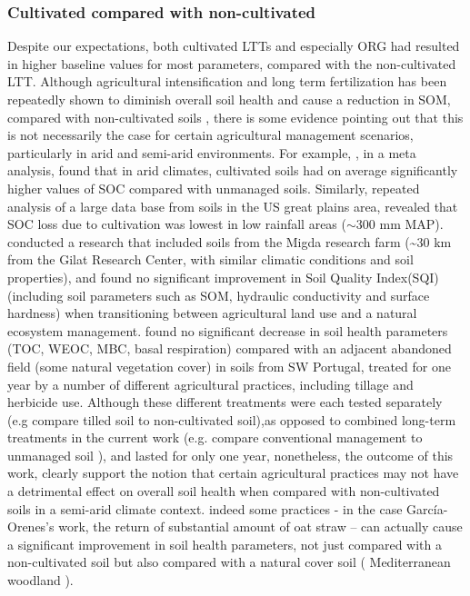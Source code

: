 \documentclass[12pt]{report}
\begin{document}
		\subsubsection{Cultivated compared with non-cultivated}
			Despite our expectations, both cultivated LTTs and especially ORG had resulted in higher baseline values for most parameters, compared with the non-cultivated LTT. Although agricultural intensification and long term fertilization has been repeatedly shown to diminish overall soil health and cause a reduction in SOM, compared with non-cultivated soils \citep{laurance2014, mganga2016, tilman2011}, there is some evidence pointing out that this is not necessarily the case for certain agricultural management scenarios, particularly in arid and semi-arid environments.  For example, \citet{trivedi2016}, in a meta analysis, found that in arid climates, cultivated soils had on average significantly higher values of SOC compared with unmanaged soils. Similarly, repeated analysis of a large data base from soils in the US great plains area, revealed that SOC loss due to cultivation was lowest in low rainfall areas ($ \sim $300 mm MAP)\citep{miller2004, burke1989}. \citet{paz-kagan2014} conducted a research that included soils from the Migda research farm (\~{}30 km from the Gilat Research Center, with similar climatic conditions and soil properties), and found no significant improvement in Soil Quality Index(SQI) (including soil parameters such as SOM, hydraulic conductivity and surface hardness) when transitioning between agricultural land use and a natural ecosystem management. \citet{garcia-orenes2010} found no significant decrease in soil health parameters (TOC, WEOC, MBC, basal respiration) compared with an adjacent abandoned field (some natural vegetation cover) in soils from SW Portugal, treated for one year by  a number of different agricultural practices, including tillage and herbicide use. Although these different treatments were each tested separately (e.g compare tilled soil to non-cultivated soil),as opposed to combined long-term treatments in the current work (e.g. compare conventional management to unmanaged soil ), and lasted for only one year, nonetheless, the outcome of this work, clearly support the notion that certain agricultural practices may not have a detrimental effect on overall soil health when compared with non-cultivated soils in a semi-arid climate context. indeed some practices - in the case García-Orenes’s work, the return of substantial amount of oat straw – can actually cause a significant improvement in soil health parameters, not just compared with a non-cultivated soil but also compared with a natural cover soil ( Mediterranean woodland ).\\
\end{document}
